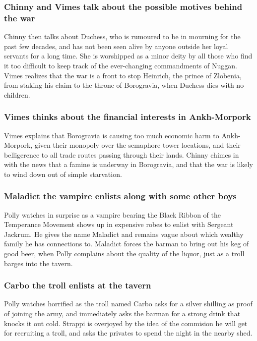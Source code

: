 \subsubsection{\Gls{Chinny} and \Gls{Vimes} talk about the possible motives behind the war}
\Gls{Chinny} then talks about \Gls{Duchess}, who is rumoured to be in mourning for the past few
decades, and has not been seen alive by anyone outside her loyal servants for a long time. She is
worshipped as a minor deity by all those who find it too difficult to keep track of the
ever-changing commandments of \Gls{Nuggan}. \Gls{Vimes} realizes that the war is a front to stop
\Gls{Heinrich}, the prince of Zlobenia, from staking his claim to the throne of Borogravia, when
\Gls{Duchess} dies with no children.

\subsubsection{\Gls{Vimes} thinks about the financial interests in Ankh-Morpork}
\Gls{Vimes} explains that Borogravia is causing too much economic harm to Ankh-Morpork, given their
monopoly over the semaphore tower locations, and their belligerence to all trade routes passing
through their lands. \Gls{Chinny} chimes in with the news that a famine is underway in Borogravia,
and that the war is likely to wind down out of simple starvation.

\subsubsection{\Gls{Maladict} the vampire enlists along with some other boys}
\Gls{Polly} watches in surprise as a vampire bearing the Black Ribbon of the Temperance Movement
shows up in expensive robes to enlist with Sergeant \Gls{Jackrum}. He gives the name \Gls{Maladict}
and remains vague about which wealthy family he has connections to. \Gls{Maladict} forces the
barman to bring out his keg of good beer, when \Gls{Polly} complains about the quality of the
liquor, just as a troll barges into the tavern.

\subsubsection{\Gls{Carbo} the troll enlists at the tavern}
\Gls{Polly} watches horrified as the troll named \Gls{Carbo} asks for a silver shilling as proof of
joining the army, and immediately asks the barman for a strong drink that knocks it out cold.
\Gls{Strappi} is overjoyed by the idea of the commision he will get for recruiting a troll, and asks
the privates to spend the night in the nearby shed.


